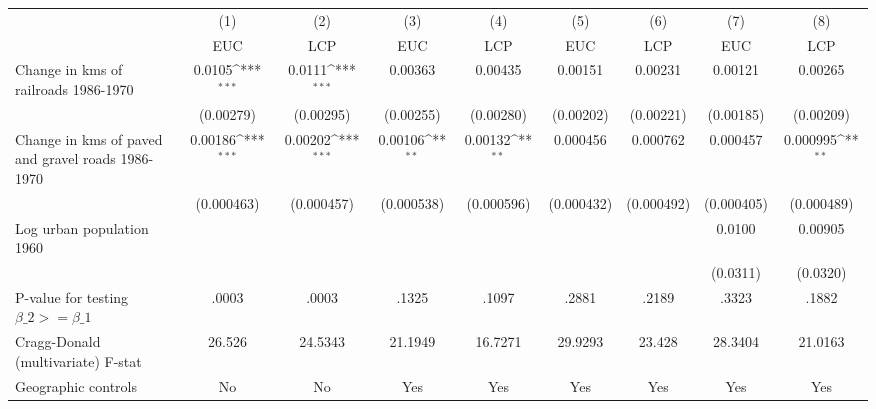 {
\def\sym#1{\ifmmode^{#1}\else\(^{#1}\)\fi}
\begin{tabular}{l*{8}{c}}
\hline\hline
                &\multicolumn{1}{c}{(1)}&\multicolumn{1}{c}{(2)}&\multicolumn{1}{c}{(3)}&\multicolumn{1}{c}{(4)}&\multicolumn{1}{c}{(5)}&\multicolumn{1}{c}{(6)}&\multicolumn{1}{c}{(7)}&\multicolumn{1}{c}{(8)}\\
                &\multicolumn{1}{c}{EUC}&\multicolumn{1}{c}{LCP}&\multicolumn{1}{c}{EUC}&\multicolumn{1}{c}{LCP}&\multicolumn{1}{c}{EUC}&\multicolumn{1}{c}{LCP}&\multicolumn{1}{c}{EUC}&\multicolumn{1}{c}{LCP}\\
\hline
Change in kms of railroads 1986-1970&   0.0105\sym{***}&   0.0111\sym{***}&  0.00363         &  0.00435         &  0.00151         &  0.00231         &  0.00121         &  0.00265         \\
                &(0.00279)         &(0.00295)         &(0.00255)         &(0.00280)         &(0.00202)         &(0.00221)         &(0.00185)         &(0.00209)         \\
[1em]
Change in kms of paved and gravel roads 1986-1970&  0.00186\sym{***}&  0.00202\sym{***}&  0.00106\sym{**} &  0.00132\sym{**} & 0.000456         & 0.000762         & 0.000457         & 0.000995\sym{**} \\
                &(0.000463)         &(0.000457)         &(0.000538)         &(0.000596)         &(0.000432)         &(0.000492)         &(0.000405)         &(0.000489)         \\
[1em]
Log urban population 1960&                  &                  &                  &                  &                  &                  &   0.0100         &  0.00905         \\
                &                  &                  &                  &                  &                  &                  & (0.0311)         & (0.0320)         \\
\hline
P-value for testing $\beta\_{2} >= \beta\_{1}$&    .0003         &    .0003         &    .1325         &    .1097         &    .2881         &    .2189         &    .3323         &    .1882         \\
Cragg-Donald (multivariate) F-stat&   26.526         &  24.5343         &  21.1949         &  16.7271         &  29.9293         &   23.428         &  28.3404         &  21.0163         \\
Geographic controls&       No         &       No         &      Yes         &      Yes         &      Yes         &      Yes         &      Yes         &      Yes         \\

\end{tabular}}
